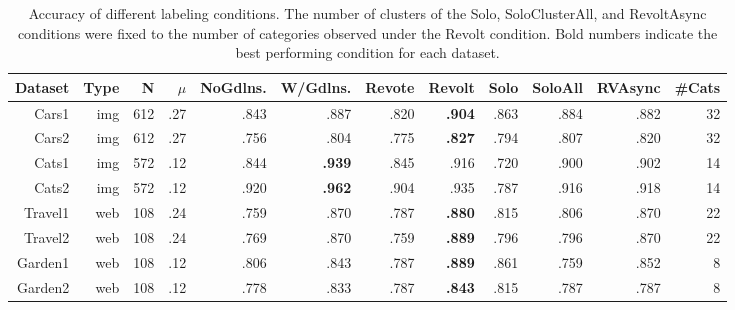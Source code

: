 \begin{table}[ht]
\centering
\footnotesize


\begin{tabular}{r r r r | r r r | r r r r r}

\hline
Dataset & Type & N & $\mu$ & NoGdlns. & W/Gdlns. & Revote & Revolt & Solo & SoloAll & RVAsync & \#Cats \\
\hline
Cars1   & img & 612 & .27 & .843 & .887 & .820 & \textbf{.904} & .863 & .884 & .882 & 32 \\
Cars2   & img & 612 & .27 & .756 & .804 & .775 & \textbf{.827} & .794 & .807 & .820 & 32 \\
Cats1   & img & 572 & .12 & .844 & \textbf{.939} & .845 & .916 & .720 & .900 & .902 & 14 \\
Cats2   & img & 572 & .12 & .920 & \textbf{.962} & .904 & .935 & .787 & .916 & .918 & 14 \\
Travel1 & web & 108 & .24 & .759 & .870          & .787 & \textbf{.880} & .815 & .806 & .870 & 22\\
Travel2 & web & 108 & .24 & .769 & .870 & .759 & \textbf{.889} & .796 & .796 & .870 & 22  \\
Garden1 & web & 108 & .12 & .806 & .843 & .787 & \textbf{.889} & .861 & .759 & .852 & 8  \\
Garden2 & web & 108 & .12 & .778 & .833 & .787 & \textbf{.843} & .815 & .787 & .787 & 8  \\
\hline

\end{tabular}

\caption[Evaluation for Revolt --- Labeling accuracy under different conditions.]{Accuracy of different labeling conditions. The number of clusters of the Solo, SoloClusterAll, and RevoltAsync conditions were fixed to the number of categories observed under the Revolt condition. Bold numbers indicate the best performing condition for each dataset.}
\label{tab:accuracy}
\end{table}



